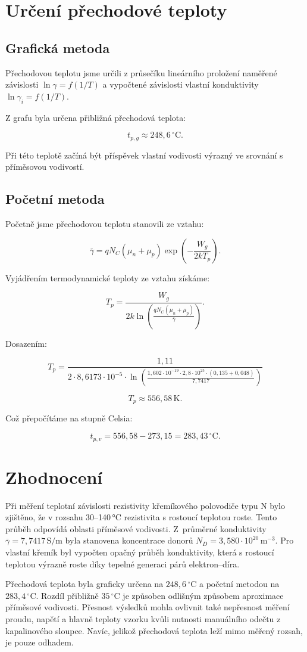 \documentclass[11pt,a4paper]{article}
\begin{document}
\section{Určení přechodové teploty}

\subsection{Grafická metoda}

Přechodovou teplotu jsme určili z průsečíku lineárního
proložení naměřené závislosti $\ln\gamma=f(1/T)$
a vypočtené závislosti vlastní konduktivity
$\ln\gamma_i=f(1/T)$.

Z grafu byla určena přibližná přechodová teplota:

\[
t_{p,g} \approx 248{,}6\,^\circ\mathrm C.
\]

Při této teplotě začíná být příspěvek vlastní vodivosti
výrazný ve srovnání s příměsovou vodivostí.

\subsection{Početní metoda}

Početně jsme přechodovou teplotu stanovili ze vztahu:

\[
\overline{\gamma}
= q N_C(\mu_n+\mu_p)
\exp\left(-\frac{W_g}{2kT_p}\right).
\]

Vyjádřením termodynamické teploty ze vztahu získáme:

\[
T_p =
\frac{W_g}
{2k\ln\left(
\frac{qN_C(\mu_n+\mu_p)}
{\overline{\gamma}}
\right)}.
\]

Dosazením:

\[
T_p =
\frac{1{,}11}
{2\cdot8{,}6173\cdot10^{-5}
\cdot\ln\left(
\frac{
1{,}602\cdot10^{-19}\cdot
2{,}8\cdot10^{25}\cdot
(0{,}135+0{,}048)
}{7{,}7417}
\right)}
\]

\[
T_p \approx 556{,}58\,\mathrm K.
\]

Což přepočítáme na stupně Celsia:

\[
t_{p,v} = 556{,}58-273{,}15
=\boxed{283{,}43\,^\circ\mathrm C}.
\]


\section{Zhodnocení}
Při měření teplotní závislosti rezistivity křemíkového polovodiče typu N bylo zjištěno, že v rozsahu 30--140\,°C rezistivita s rostoucí teplotou roste. Tento průběh odpovídá oblasti příměsové vodivosti.
Z~průměrné konduktivity $\overline{\gamma}=7{,}7417\,\mathrm{S/m}$ byla stanovena koncentrace donorů $N_D=3{,}580\cdot10^{20}\,\mathrm{m^{-3}}$. 
Pro vlastní křemík byl vypočten opačný průběh konduktivity, která s rostoucí teplotou výrazně roste díky tepelné generaci párů elektron--díra.

Přechodová teplota byla graficky určena na $248{,}6\,^\circ\mathrm C$ a početní metodou na $283{,}4\,^\circ\mathrm C$. Rozdíl přibližně $35\,^\circ\mathrm C$ je způsoben odlišným způsobem aproximace příměsové vodivosti. Přesnost výsledků mohla ovlivnit také nepřesnost měření proudu, napětí a hlavně teploty vzorku kvůli nutnosti manuálního odečtu z kapalinového sloupce. 
Navíc, jelikož přechodová teplota leží mimo měřený rozsah, je pouze odhadem.
\end{document}
